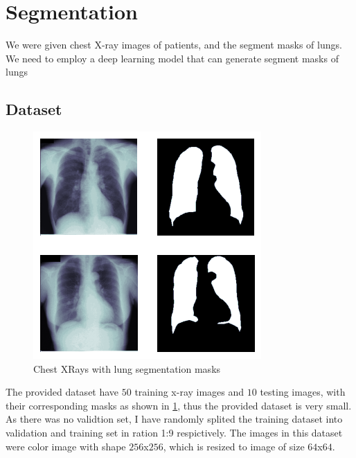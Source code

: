 \section{Segmentation}
\label{sec:warmup5}

    We were given chest X-ray images of patients, and the segment masks of lungs. We need to employ a deep learning model that can generate segment masks of lungs

\subsection{Dataset}

    \begin{figure}
        \centering
        \includegraphics[width=\linewidth]{images/sample-segmentations.png}
        \caption{Chest XRays with lung segmentation masks}
        \label{fig:sample-segmentations}
    \end{figure}

    The provided dataset have $50$ training x-ray images and $10$ testing images, with their corresponding masks as shown in \cref{fig:sample-segmentations}, thus the provided dataset is very small. As there was no validtion set, I have randomly splited the training dataset into validation and training set in ration 1:9 respictively. The images in this dataset were color image with shape $256$x$256$, which is resized to image of size $64$x$64$.

